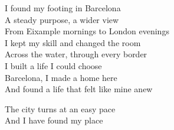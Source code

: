 \begin{lyrics}
I found my footing in Barcelona\\
A steady purpose, a wider view\\
From Eixample mornings to London evenings\\
I kept my skill and changed the room\\
Across the water, through every border\\
I built a life I could choose\\
Barcelona, I made a home here\\
And found a life that felt like mine anew

The city turns at an easy pace\\
And I have found my place
\end{lyrics}

